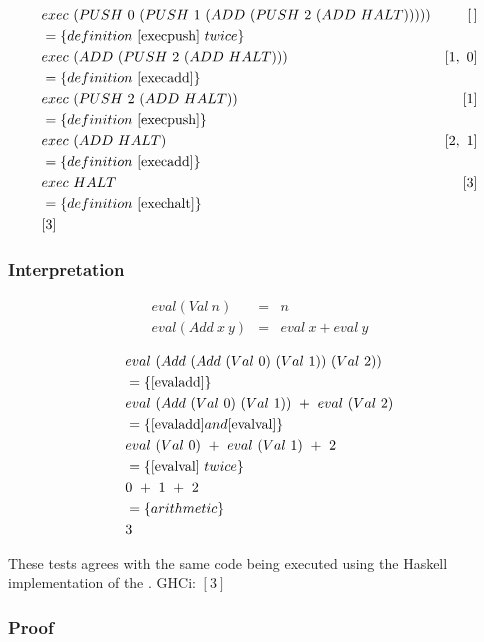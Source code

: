 \documentclass {article}
\begin{document}
\begin{align*}
&exec\ (PUSH\ 0\ (PUSH\ 1\ (ADD\ (PUSH\ 2\ (ADD\ HALT))))) &[\, ] \\
&= \{ definition\ \ref{execpush}\ twice \} \\
&exec\ (ADD\ (PUSH\ 2\ (ADD\ HALT))) 					&[1,\ 0] \\
&= \{ definition\ \ref{execadd} \} \\
&exec\ (PUSH\ 2\ (ADD\ HALT)) 								&[1] \\
&= \{ definition\ \ref{execpush} \} \\
&exec\ (ADD\ HALT)										 &[2,\ 1] \\
&= \{ definition\ \ref{execadd} \} \\
&exec\ HALT 												&[3] \\
&= \{ definition\ \ref{exechalt} \} \\
&[3]
\end{align*}

\subsubsection{Interpretation}

\begin{eqnarray}
	 eval (Val \  n) &=& n \label{evalval}\\
	 eval (Add \  x \  y) &=& eval \  x + eval \  y \label{evaladd}
\end{eqnarray}

\begin{align*}
	&eval\ (Add\ (Add\ (Val\ 0)\ (Val\ 1))\ (Val\ 2)) \\
	&= \{ \ref{evaladd} \} \\
	&eval\ (Add\ (Val\ 0)\ (Val\ 1))\ +\ eval\ (Val\ 2) \\
	&= \{ \ref{evaladd} and \ref{evalval} \} \\
	&eval\ (Val\ 0)\ +\ eval\ (Val\ 1)\ +\ 2 \\
	&= \{ \ref{evalval}\ twice\} \\
	&0\ +\ 1\ +\ 2 \\
	&= \{ arithmetic \} \\
	&3
\end{align*}

These tests agrees with the same code being executed
using the Haskell implementation of the \vm.
GHCi: \( [3] \)


\subsubsection{Proof}
\end{document}

